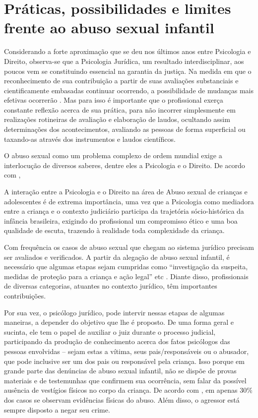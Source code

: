 \section{Práticas, possibilidades e limites frente ao abuso sexual infantil}

Considerando a forte aproximação que se deu nos últimos anos entre Psicologia e Direito, observa-se que a Psicologia Jurídica, um resultado interdisciplinar, aos poucos vem se constituindo essencial na garantia da justiça. Na medida em que o reconhecimento de sua contribuição a partir de suas avaliações substanciais e cientificamente embasadas continuar ocorrendo, a possibilidade de mudanças mais efetivas ocorrerão . Mas para isso é importante que o profissional exerça constante reflexão acerca de sua prática, para não incorrer simplesmente em realizações rotineiras de avaliação e elaboração de laudos, ocultando assim determinações dos acontecimentos, avaliando as pessoas de forma superficial ou taxando-as através dos instrumentos e laudos científicos.

O abuso sexual como um problema complexo de ordem mundial exige a interlocução de diversos saberes, dentre eles a Psicologia e o Direito. De acordo com , 

\begin{citacao}
	A interação entre a Psicologia e o Direito na área de Abuso sexual de crianças e adolescentes é de extrema importância, uma vez que a Psicologia como mediadora entre a criança e o contexto judiciário participa da trajetória sócio-histórica da infância brasileira, exigindo do profissional um compromisso ético e uma boa qualidade de escuta, trazendo à realidade toda complexidade da criança.
\end{citacao}

Com frequência os casos de abuso sexual que chegam ao sistema jurídico precisam ser avaliados e verificados. A partir da alegação de abuso sexual infantil, é necessário que algumas etapas sejam cumpridas como ``investigação da suspeita, medidas de proteção para a criança e ação legal'' etc . Diante disso, profissionais de diversas categorias, atuantes no contexto jurídico, têm importantes contribuições. 

Por sua vez, o psicólogo jurídico, pode intervir nessas etapas de algumas maneiras, a depender do objetivo que lhe é proposto. De uma forma geral e sucinta, ele tem o papel de auxiliar o juiz durante o processo judicial, participando da produção de conhecimento acerca dos fatos psicólogos das pessoas envolvidas -- sejam estas a vítima, seus pais/responsáveis ou o abusador, que pode inclusive ser um dos pais ou responsável pela criança. Isso porque em grande parte das denúncias de abuso sexual infantil, não se dispõe de provas materiais e de testemunhas que confirmem  sua ocorrência, sem falar da possível ausência de vestígios físicos no corpo da criança. De acordo com , em apenas 30\% dos casos se observam evidências físicas do abuso. Além disso, o agressor está sempre disposto a negar seu crime. 

